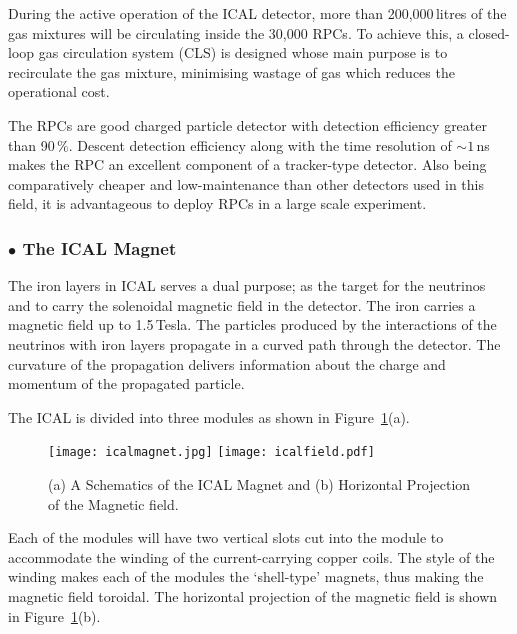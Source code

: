 During the active operation of the ICAL detector, more than 200,000\,litres of the gas mixtures will be circulating inside the 30,000 RPCs. To achieve this, a closed-loop gas circulation system (CLS) is designed whose main purpose is to recirculate the gas mixture, minimising wastage of gas which reduces the operational cost.

The RPCs are good charged particle detector with detection efficiency greater than 90\,\%. Descent detection efficiency along with the time resolution of $\sim 1$\,ns makes the RPC an excellent component of a tracker-type detector. Also being comparatively cheaper and low-maintenance than other detectors used in this field, it is advantageous to deploy RPCs in a large scale experiment.

\subsubsection*{$\bullet$ The ICAL Magnet}
The iron layers in ICAL serves a dual purpose; as the target for the neutrinos and to carry the solenoidal magnetic field in the detector\cite{icalmagnet}. The iron carries a magnetic field up to 1.5\,Tesla. The particles produced by the interactions of the neutrinos with iron layers propagate in a curved path through the detector. The curvature of the propagation delivers information about the charge and momentum of the propagated particle.

The ICAL is divided into three modules as shown in Figure~\ref{fig:magnet}(a). 
\begin{figure}[h]
  \centering
  \texttt{[image: icalmagnet.jpg]}
  \texttt{[image: icalfield.pdf]}
  \caption{(a) A Schematics of the ICAL Magnet and (b) Horizontal Projection of the Magnetic field\cite{icalmagnet}.}
  \label{fig:magnet}
\end{figure}
Each of the modules will have two vertical slots cut into the module to accommodate the winding of the current-carrying copper coils. The style of the winding makes each of the modules the `shell-type'\cite{transformer} magnets, thus making the magnetic field toroidal. The horizontal projection of the magnetic field is shown in Figure~\ref{fig:magnet}(b).


